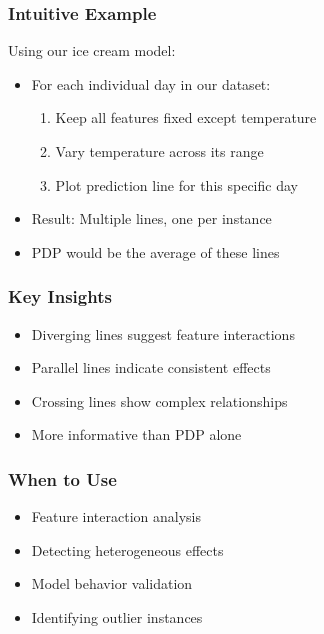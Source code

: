 \documentclass{article}
\begin{document}
\subsubsection{Intuitive Example}
Using our ice cream model:
\begin{itemize}
    \item For each individual day in our dataset:
    \begin{enumerate}
        \item Keep all features fixed except temperature
        \item Vary temperature across its range
        \item Plot prediction line for this specific day
    \end{enumerate}
    \item Result: Multiple lines, one per instance
    \item PDP would be the average of these lines
\end{itemize}

\subsubsection{Key Insights}
\begin{itemize}
    \item Diverging lines suggest feature interactions
    \item Parallel lines indicate consistent effects
    \item Crossing lines show complex relationships
    \item More informative than PDP alone
\end{itemize}

\subsubsection{When to Use}
\begin{itemize}
    \item Feature interaction analysis
    \item Detecting heterogeneous effects
    \item Model behavior validation
    \item Identifying outlier instances
\end{itemize}
\end{document}
